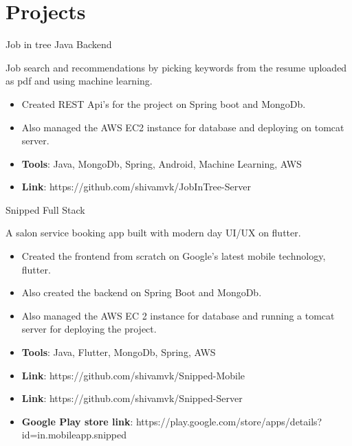 \documentclass[letterpaper]{twentysecondcv} %
\begin{document}
\section{Projects}
\begin{twenty}
	\twentyitem
    	{}
		{}
        {Job in tree}
        {{}{Java Backend}}
        {}
        {
       	\textbf{}Job search and recommendations by picking keywords from the resume uploaded as pdf and using machine learning.
        {\begin{itemize}
        \item Created REST Api's for the project on Spring boot and MongoDb.
        \item Also managed the AWS EC2 instance for database and deploying on tomcat server. 
        \item \textbf{Tools}: Java, MongoDb, Spring, Android, Machine Learning, AWS \item \textbf{Link}: https://github.com/shivamvk/JobInTree-Server \vspace{2mm}
		\end{itemize}}
        }
\end{twenty}
\vspace{2mm}
\begin{twenty}
	\twentyitem
    	{}
		{}
        {Snipped}
        {{}{Full Stack}}
        {}
        {
       	\textbf{}A salon service booking app built with modern day UI/UX on flutter.
        {\begin{itemize}
        \item Created the frontend from scratch on Google's latest mobile technology, flutter.
        \item Also created the backend on Spring Boot and MongoDb. \item Also managed the AWS EC 2 instance for database and running a tomcat server for deploying the project.
        \item \textbf{Tools}: Java, Flutter, MongoDb, Spring, AWS \item \textbf{Link}: https://github.com/shivamvk/Snipped-Mobile \item \textbf{Link}: https://github.com/shivamvk/Snipped-Server \item \textbf{Google Play store link}: https://play.google.com/store/apps/details? id=in.mobileapp.snipped \vspace{2mm}
		\end{itemize}}
        }
\end{twenty}
\vspace{2mm}
\end{document}
